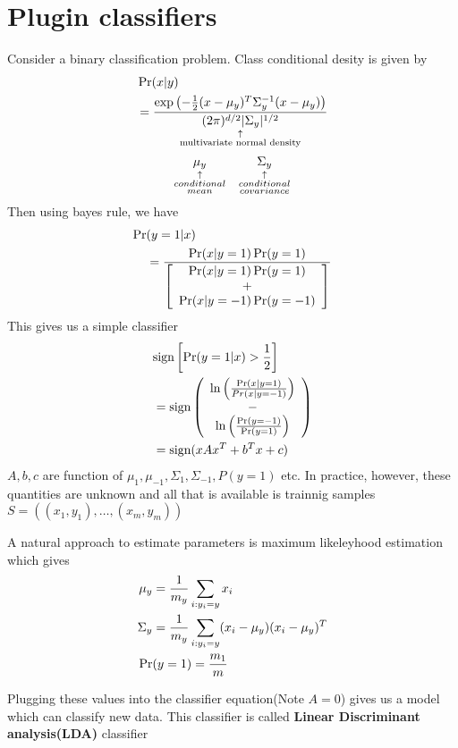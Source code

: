 \section{Plugin classifiers}
\begin{slidemaximus}
\begin{multicols}{3}
Consider a binary classification problem. Class conditional desity is given by
\begin{align*}
	&\Pr(x|y)
	\\
	&= \explain{{\exp\left(-{1\over2} (x-\mu_y)^T\Sigma_y^{-1}(x-\mu_y)\right)\over (2\pi)^{d/2}|\Sigma_y|^{1/2}}}{\text{multivariate normal density}}
\end{align*}
$$\explain{\mu_y}{conditional\\mean} \qquad\qquad \explain{\Sigma_y}{conditional\\covariance}$$
Then using bayes rule, we have
\begin{align*}
	\Pr&(y=1|x) 
	\\
	&={\Pr(x|y=1)\Pr(y=1)\over \left[\begin{array}{c}\Pr(x|y=1)\Pr(y=1)\\+\\ \Pr(x|y=-1)\Pr(y=-1)\end{array}\right]}
\end{align*}
This gives us a simple classifier 
\begin{align*}
	&\text{sign}\left[\Pr(y=1|x)>{1\over 2}\right]
	\\
	&=\text{sign}\left(\begin{array}{c}\ln\left({\Pr(x|y=1)\over Pr(x|y=-1)}\right)\\-\\\ln\left({\Pr(y=-1)\over \Pr(y=1)}\right)\end{array}\right)
	\\
	&=\text{sign}(xAx^T+b^Tx+c)
\end{align*}
$A,b,c$ are function of $\mu_1,\mu_{-1},\Sigma_1,\Sigma_{-1}, P(y=1)$ etc. In practice, however, these quantities are unknown and all that is available is trainnig samples $S=((x_1,y_1), \ldots, (x_m,y_m))$

A natural approach to estimate parameters is maximum likeleyhood estimation which gives
\begin{align*}
	\mu_y &= {1\over m_y}\sum_{i:y_i=y} x_i
	\\
	\Sigma_y &= {1\over m_y}\sum_{i:y_i=y}(x_i-\mu_y)(x_i-\mu_y)^T
	\\
	\Pr&(y=1) = {m_1\over m}
\end{align*}
\end{multicols}
Plugging these values into the classifier equation(Note $A=0$) gives us a model which can classify new data.
This classifier is called \textbf{Linear Discriminant analysis(LDA)} classifier
\end{slidemaximus}
